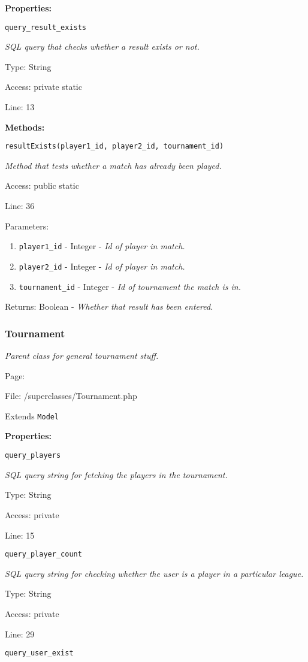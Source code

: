 \textbf{Properties:}

\texttt{query\_result\_exists}

{\scriptsize
\textit{SQL query that checks whether a result exists or not.}

Type: String

Access: private static

Line: 13

}
\textbf{Methods:}

\texttt{resultExists(player1\_id, player2\_id, tournament\_id)}

{\scriptsize
\textit{Method that tests whether a match has already been played.}

Access: public static

Line: 36

Parameters:

\begin{enumerate}
\item \texttt{player1\_id} - Integer - \textit{Id of player in match.}
\item \texttt{player2\_id} - Integer - \textit{Id of player in match.}
\item \texttt{tournament\_id} - Integer - \textit{Id of tournament the match is in.}
\end{enumerate}
Returns: Boolean - \textit{Whether that result has been entered.}

}

\subsubsection{Tournament}\label{Tournament.php.doc}
\textit{Parent class for general tournament stuff.}

Page: \pageref{Tournament.php}

File: /superclasses/Tournament.php

Extends \texttt{Model}

\textbf{Properties:}

\texttt{query\_players}

{\scriptsize
\textit{SQL query string for fetching the players in the tournament.}

Type: String

Access: private

Line: 15

}
\texttt{query\_player\_count}

{\scriptsize
\textit{SQL query string for checking whether the user is a player in a particular league.}

Type: String

Access: private

Line: 29

}
\texttt{query\_user\_exist}

